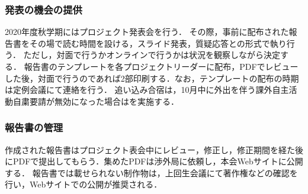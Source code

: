 \subsubsection* {発表の機会の提供}

2020年度秋学期にはプロジェクト発表会を行う．
その際，事前に配布された報告書をその場で読む時間を設ける，スライド発表，質疑応答との形式で執り行う．
ただし，対面で行うかオンラインで行うかは状況を観察しながら決定する．
報告書のテンプレートを各プロジェクトリーダーに配布，PDFでレビューした後，対面で行うのであれば2部印刷する．なお，テンプレートの配布の時期は定例会議にて連絡を行う．
追い込み合宿は，10月中に外出を伴う課外自主活動自粛要請が無効になった場合はを実施する．

\subsubsection* {報告書の管理}

作成された報告書はプロジェクト表会中にレビュー，修正し，修正期間を経た後にPDFで提出してもらう．集めたPDFは渉外局に依頼し，本会Webサイトに公開する．
報告書では載せられない制作物は，上回生会議にて著作権などの確認を行い，Webサイトでの公開が推奨される．

